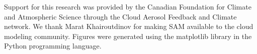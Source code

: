 \documentclass[acp]{copernicus}
\begin{document}


\begin{acknowledgements}
Support for this research was provided by the Canadian Foundation for Climate 
and Atmospheric Science through the Cloud Aerosol Feedback and Climate 
network. We thank Marat Khairoutdinov for making SAM available to the cloud 
modeling community. Figures were generated using the matplotlib library in the 
Python programming language.
\end{acknowledgements}

















\end{document}
